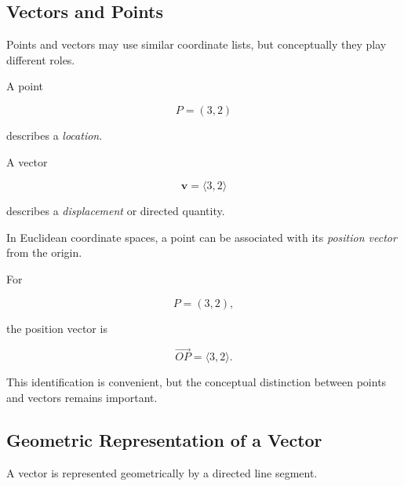 \subsection{Vectors and Points}
\label{subsec:vectors-and-points}

Points and vectors may use similar coordinate lists, but conceptually they
play different roles.

A point

\[ P=(3,2) \]

describes a \emph{location}.

A vector

\[ \mathbf{v}=\langle3,2\rangle \]

describes a \emph{displacement} or directed quantity.

In Euclidean coordinate spaces, a point can be associated with its
\emph{position vector} from the origin.

For

\[ P=(3,2), \]

the position vector is

\[ \overrightarrow{OP}=\langle3,2\rangle. \]

This identification is convenient, but the conceptual distinction between
points and vectors remains important.

\subsection{Geometric Representation of a Vector}
\label{subsec:geometric-vector-representation}

A vector is represented geometrically by a directed line segment.

\begin{centereddiagram}
\end{centereddiagram}

